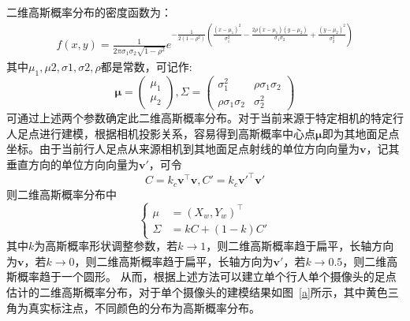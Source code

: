 二维高斯概率分布的密度函数为：
\begin{equation}
  \begin{aligned}
    f(x,y)=\frac{1}{2\pi\sigma_{1}\sigma_{2}\sqrt{1-\rho^{2}}}
    e^{
      -\frac{1}{2(1-\rho^{2})}\left(
        \frac{(x-\mu_{1})^{2}}{\sigma_{1}^{2}} - \frac{2\rho(x-\mu_{1})(y-\mu_{2})}{\sigma_{1}\sigma_{2}} 
        + \frac{(y-\mu_{2})^{2}}{\sigma_{2}^{2}}
        \right)
      }
  \end{aligned}
\end{equation}
其中$\mu_{1},\mu{2},\sigma{1},\sigma{2},\rho$都是常数，可记作:
\begin{equation}
  \bm{\mu}=\left(
    \begin{matrix}
      \mu_{1} \\ \mu_{2}
    \end{matrix}
  \right),
  \Sigma=\left(
    \begin{matrix}
      \sigma_{1}^{2} & \rho\sigma_{1}\sigma_{2} \\
      \rho\sigma_{1}\sigma_{2} & \sigma_{2}^{2}
    \end{matrix}
  \right)
\end{equation}
可通过上述两个参数确定此二维高斯概率分布。对于当前来源于特定相机的特定行人足点进行建模，根据相机投影关系，容易得到高斯概率中心点$\bm{\mu}$即为其地面足点坐标。由于当前行人足点从来源相机到其地面足点射线的单位方向向量为$\bm{v}$，记其垂直方向的单位方向向量为$\bm{v}'$，可令
\begin{equation}
C=k_{c}\bm{v}^\top\bm{v}, C'=k_{c}\bm{v}'^\top\bm{v}'
\end{equation}
则二维高斯概率分布中
\begin{equation}
  \left\{
    \begin{aligned}
      \mu & = (X_{w}, Y_{w})^\top \\
      \Sigma & = kC + (1-k)C'
    \end{aligned}
  \right.
\end{equation}
其中$k$为高斯概率形状调整参数，若$k\rightarrow1$，则二维高斯概率趋于扁平，长轴方向为$\bm{v}$，若$k\rightarrow0$，则二维高斯概率趋于扁平，长轴方向为$\bm{v}'$，若$k\rightarrow0.5$，则二维高斯概率趋于一个圆形。
从而，根据上述方法可以建立单个行人单个摄像头的足点估计的二维高斯概率分布，对于单个摄像头的建模结果如图~\ref{a}所示，其中黄色三角为真实标注点，不同颜色的分布为高斯概率分布。
